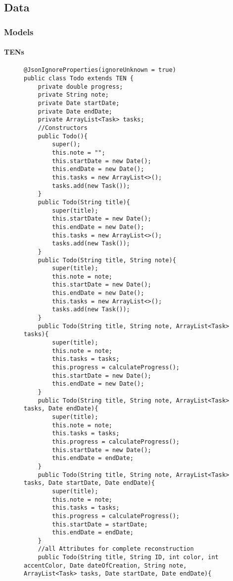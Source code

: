 \subsection{Data}
	\subsubsection{Models}
		\paragraph{TENs}	
\begin{figure}[H]
\begin{lstlisting}[caption=Todo (Joscha Nassenstein)]
@JsonIgnoreProperties(ignoreUnknown = true)
public class Todo extends TEN {
    private double progress;
    private String note;
    private Date startDate;
    private Date endDate;
    private ArrayList<Task> tasks;
    //Constructors
    public Todo(){
        super();
        this.note = "";
        this.startDate = new Date();
        this.endDate = new Date();
        this.tasks = new ArrayList<>();
        tasks.add(new Task());
    }
    public Todo(String title){
        super(title);
        this.startDate = new Date();
        this.endDate = new Date();
        this.tasks = new ArrayList<>();
        tasks.add(new Task());
    }
    public Todo(String title, String note){
        super(title);
        this.note = note;
        this.startDate = new Date();
        this.endDate = new Date();
        this.tasks = new ArrayList<>();
        tasks.add(new Task());
    }
    public Todo(String title, String note, ArrayList<Task> tasks){
        super(title);
        this.note = note;
        this.tasks = tasks;
        this.progress = calculateProgress();
        this.startDate = new Date();
        this.endDate = new Date();
    }
    public Todo(String title, String note, ArrayList<Task> tasks, Date endDate){
        super(title);
        this.note = note;
        this.tasks = tasks;
        this.progress = calculateProgress();
        this.startDate = new Date();
        this.endDate = endDate;
    }
    public Todo(String title, String note, ArrayList<Task> tasks, Date startDate, Date endDate){
        super(title);
        this.note = note;
        this.tasks = tasks;
        this.progress = calculateProgress();
        this.startDate = startDate;
        this.endDate = endDate;
    }
    //all Attributes for complete reconstruction
    public Todo(String title, String ID, int color, int accentColor, Date dateOfCreation, String note, ArrayList<Task> tasks, Date startDate, Date endDate){

\end{lstlisting}
\end{figure}
